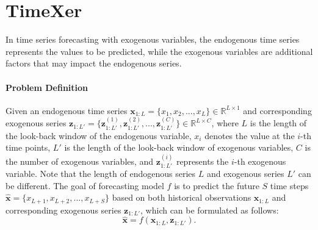 \documentclass[nohyperref]{article}
\theoremstyle{plain}
\theoremstyle{definition}
\theoremstyle{remark}
\begin{document}
\section{TimeXer}
In time series forecasting with exogenous variables, the endogenous time series represents the values to be predicted, while the exogenous variables are additional factors that may impact the endogenous series.

\paragraph{Problem Definition} Given an endogenous time series $ \mathbf{x}_{1:L} = \{x_1, x_2, ..., x_L\} \in \mathbb{R}^{L\times 1}$ and corresponding exogenous series $\mathbf{z}_{1:L'}=\{\mathbf{z}^{(1)}_{1:L'}, \mathbf{z}^{(2)}_{1:L'}, ..., \mathbf{z}^{(C)}_{1:L'}\} \in \mathbb{R}^{L\times C}$, where $L$ is the length of the look-back window of the endogenous variable, $x_i$ denotes the value at the $i$-th time points, $L'$ is the length of the look-back window of exogenous variables, $C$ is the number of exogenous variables, and $\mathbf{z}^{(i)}_{1:L'}$ represents the $i$-th exogenous variable. Note that the length of endogenous series $L$ and exogenous series $L'$ can be different.
The goal of forecasting model $f$ is to predict the future $S$ time steps  $\widehat{\mathbf{x}}=\{x_{L+1}, x_{L+2}, ..., x_{L+S}\}$ based on both historical observations $\mathbf{x}_{1:L}$ and corresponding exogenous series $\mathbf{z}_{1:L'}$, which can be formulated as follows:
\begin{equation}
    \mathbf{\widehat{x}} = f \left( \mathbf{x}_{1:L}, \mathbf{z}_{1:L'} \right).
\end{equation}
\end{document}
